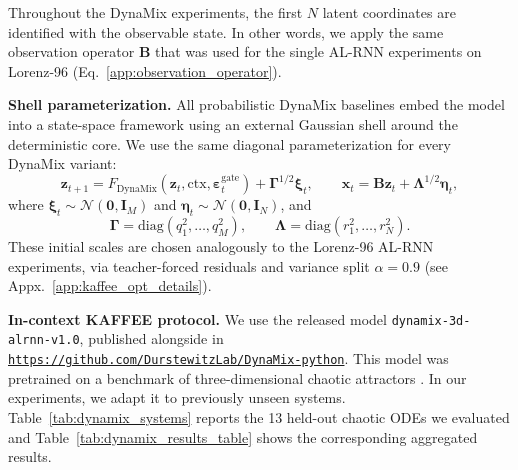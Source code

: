 \documentclass{article}
\theoremstyle{plain}
\theoremstyle{definition}
\theoremstyle{remark}
\newcommand{\diag}{\mathrm{diag}}
\begin{document}
Throughout the DynaMix experiments, the first $N$ latent coordinates are identified with the observable state. In other words, we apply the same observation operator $\bm B$ that was used for the single AL-RNN experiments on Lorenz-96 (Eq.~\ref{app:observation_operator}).

\textbf{Shell parameterization.} All probabilistic DynaMix baselines embed the model into a state-space framework using an external Gaussian shell around the deterministic core. We use the same diagonal parameterization for every DynaMix variant:
\begin{equation}
\label{eq:dynamix_ssm}
\bm z_{t+1}=F_{\mathrm{DynaMix}}(\bm z_t,\mathrm{ctx},\bm \varepsilon_t^{\mathrm{gate}})+\bm \Gamma^{1/2}\bm \xi_t,
\qquad
\bm x_t=\bm B\bm z_t+\bm \Lambda^{1/2}\bm \eta_t,
\end{equation}
where $\bm \xi_t \sim \mathcal{N}(\bm 0, \bm I_M)$ and $\bm \eta_t \sim \mathcal{N}(\bm 0, \bm I_N)$,
and
\[
\bm \Gamma=\diag(q_1^2,\ldots,q_M^2),
\qquad
\bm \Lambda=\diag(r_1^2,\ldots,r_N^2).
\]
These initial scales are chosen analogously to the Lorenz-96 AL-RNN experiments, via teacher-forced residuals and variance split $\alpha = 0.9$ (see Appx.~\ref{app:kaffee_opt_details}).

\textbf{In-context KAFFEE protocol.} We use the released model \texttt{dynamix-3d-alrnn-v1.0},
published alongside \cite{hemmer2025true} in \texttt{\url{https://github.com/DurstewitzLab/DynaMix-python}}. This model was pretrained on a benchmark of three-dimensional chaotic attractors \citep{gilpin2021chaos}. In our experiments, we adapt it to previously unseen systems. Table~\ref{tab:dynamix_systems} reports the 13 held-out chaotic ODEs we evaluated and Table~\ref{tab:dynamix_results_table} shows the corresponding aggregated results.
\end{document}
